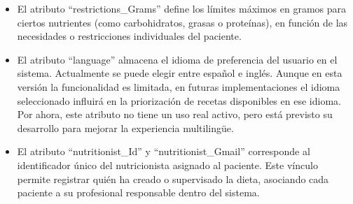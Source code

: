 \begin{itemize}
\item El atributo ``restrictions\_Grams'' define los límites máximos en gramos para ciertos nutrientes (como carbohidratos, grasas o proteínas), en función de las necesidades o restricciones individuales del paciente.

\item El atributo ``language'' almacena el idioma de preferencia del usuario en el sistema. Actualmente se puede elegir entre español e inglés. Aunque en esta versión la funcionalidad es limitada, en futuras implementaciones el idioma seleccionado influirá en la priorización de recetas disponibles en ese idioma. Por ahora, este atributo no tiene un uso real activo, pero está previsto su desarrollo para mejorar la experiencia multilingüe.

\item El atributo ``nutritionist\_Id'' y  ``nutritionist\_Gmail'' corresponde al identificador único del nutricionista asignado al paciente. Este vínculo permite registrar quién ha creado o supervisado la dieta, asociando cada paciente a su profesional responsable dentro del sistema.
\end{itemize}


